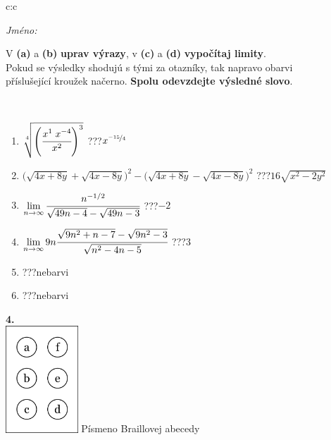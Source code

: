 \documentclass[10pt]{report}
\begin{document}
\begin{tabular}{c:c}
\begin{minipage}[c][104.5mm][t]{0.5\linewidth}
\begin{center}
\textit{Jméno:}\phantom{xxxxxxxxxxxxxxxxxxxxxxxxxxxxxxxxxxxxxxxxxxxxxxxxxxxxxxxxxxxxxxxxx}\\[5mm]
\begin{minipage}{0.95\linewidth}
\begin{center}
V \textbf{(a)} a \textbf{(b)} \textbf{uprav výrazy}, v \textbf{(c)} a \textbf{(d)} \textbf{vypočítaj limity}.\\Pokud se výsledky shodujú s tými za otazníky, tak napravo obarvi\\příslušející kroužek načerno. \textbf{Spolu odevzdejte výsledné slovo}.
\end{center}
\end{minipage}
\\[1mm]
\begin{minipage}{0.79\linewidth}
\begin{center}
\begin{varwidth}{\linewidth}
\begin{enumerate}
\small
\item $\sqrt[4]{\left(\cfrac{x^{1}\;x^{-4}}{x^{2}}\right)^{3}}$\quad \dotfill\; ???\;\dotfill \quad $x^{\nicefrac{-15}{4}}$
\item {\footnotesize{\scriptsize$\big(\sqrt{4x+8y}+\sqrt{4x-8y}\big)^2-\big(\sqrt{4x+8y}-\sqrt{4x-8y}\big)^2$}\quad \dotfill\; ???\;\dotfill \quad $16\sqrt{x^2-2y^2}$}
\item $\lim\limits_{n\to\infty}\cfrac{n^{-1/2}}{\sqrt{49n-4}-\sqrt{49n-3}}$\quad \dotfill\; ???\;\dotfill \quad $-2$
\item $\lim\limits_{n\to\infty}9n\cfrac{\sqrt{9n^2+n-7}-\sqrt{9n^2-3}}{\sqrt{n^2-4n-5}}$\quad \dotfill\; ???\;\dotfill \quad $3$
\item \quad \dotfill\; ???\;\dotfill \quad nebarvi
\item \quad \dotfill\; ???\;\dotfill \quad nebarvi
\end{enumerate}
\end{varwidth}
\end{center}
\end{minipage}
\begin{minipage}{0.20\linewidth}
\begin{center}
{\Huge\bfseries 4.} \\[2mm]
\includegraphics[height=40mm]{../images/braille.png}
{\small Písmeno Braillovej abecedy}
\end{center}
\end{minipage}
\end{center}
\end{minipage}
%
\end{tabular}
\end{document}
